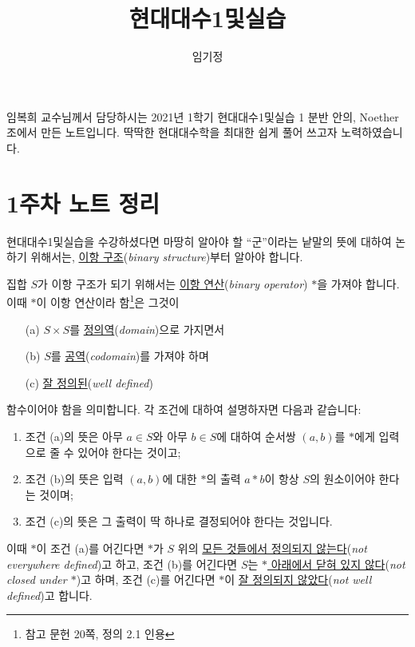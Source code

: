 \documentclass[12pt]{paper}
\title{현대대수1및실습}
\author{임기정}
\begin{document}
  \nocite{fraleigh2009}

  \maketitle
  \hspace{12pt}
  
  임복희 교수님께서 담당하시는 2021년 1학기 현대대수1및실습 1 분반 안의, Noether 조에서 만든 노트입니다.
  딱딱한 현대대수학을 최대한 쉽게 풀어 쓰고자 노력하였습니다.

  \section{1주차 노트 정리}
  \hspace{12pt}

  현대대수1및실습을 수강하셨다면 마땅히 알아야 할 ``군''이라는 낱말의 뜻에 대하여 논하기 위해서는, \underline{이항 구조}(\textit{binary structure})부터 알아야 합니다.

  집합 $S$가 이항 구조가 되기 위해서는 \underline{이항 연산}(\textit{binary operator}) $*$을 가져야 합니다.
  이때 $*$이 이항 연산이라 함\footnote{참고 문헌 \cite{fraleigh2009} 20쪽, 정의 2.1 인용}은 그것이
  \begin{enumerate}
    \item[(a)] $S \times S$를 \underline{정의역}(\textit{domain})으로 가지면서
    \item[(b)] $S$를 \underline{공역}(\textit{codomain})를 가져야 하며
    \item[(c)] \underline{잘 정의된}(\textit{well defined}) 
  \end{enumerate}
  함수이어야 함을 의미합니다.
  각 조건에 대하여 설명하자면 다음과 같습니다:
  \begin{enumerate}
    \item 조건 (a)의 뜻은 아무 $a \in S$와 아무 $b \in S$에 대하여 순서쌍 $\left( a , b \right)$를 $*$에게 입력으로 줄 수 있어야 한다는 것이고;
    \item 조건 (b)의 뜻은 입력 $\left( a , b \right)$에 대한 $*$의 출력 $a * b$이 항상 $S$의 원소이어야 한다는 것이며;
    \item 조건 (c)의 뜻은 그 출력이 딱 하나로 결정되어야 한다는 것입니다.
  \end{enumerate}
  
  이때 $*$이 조건 (a)를 어긴다면 $*$가 $S$ 위의 \underline{모든 것들에서 정의되지 않는다}(\textit{not everywhere defined})고 하고,
  조건 (b)를 어긴다면 $S$는 \underline{$*$ 아래에서 닫혀 있지 않다}(\textit{not closed under $*$})고 하며,
  조건 (c)를 어긴다면 $*$이 \underline{잘 정의되지 않았다}(\textit{not well defined})고 합니다.
\end{document}
